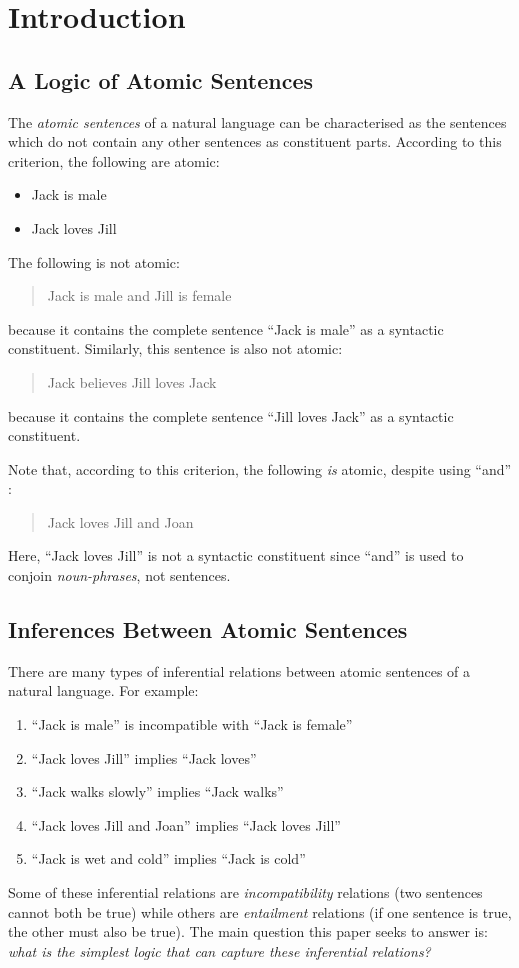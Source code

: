 \section{Introduction}\label{introduction}



\subsection{A Logic of Atomic Sentences}
The \emph{atomic sentences} of a natural language can be characterised as the sentences which do not contain any other sentences as constituent parts. 
According to this criterion, the following are atomic:
\begin{itemize}
\item
Jack is male
\item
Jack loves Jill
\end{itemize}
The following is not atomic:
\begin{quote}
Jack is male and Jill is female
\end{quote}
because it contains the complete sentence ``Jack is male'' as a syntactic constituent.
Similarly, this sentence is also not atomic:
\begin{quote}
Jack believes Jill loves Jack
\end{quote}
because it contains the complete sentence ``Jill loves Jack'' as a syntactic constituent.

Note that, according to this criterion, the following \emph{is} atomic, despite using ``and'' :
\begin{quote}
Jack loves Jill and Joan
\end{quote}
Here, ``Jack loves Jill'' is not a syntactic constituent since ``and'' is used to conjoin \emph{noun-phrases}, not sentences.

\subsection{Inferences Between Atomic Sentences}
There are many types of inferential relations between atomic sentences of a natural language.
For example:
\begin{enumerate}
\item
``Jack is male'' is incompatible with ``Jack is female''
\item
``Jack loves Jill'' implies ``Jack loves''
\item
``Jack walks slowly'' implies ``Jack walks''
\item
``Jack loves Jill and Joan'' implies ``Jack loves Jill''
\item
``Jack is wet and cold'' implies ``Jack is cold''
\end{enumerate}
Some of these inferential relations are \emph{incompatibility} relations (two sentences cannot both be true) while others are \emph{entailment} relations (if one sentence is true, the other must also be true).
The main question this paper seeks to answer is: \emph{what is the simplest logic that can capture these inferential relations?}

